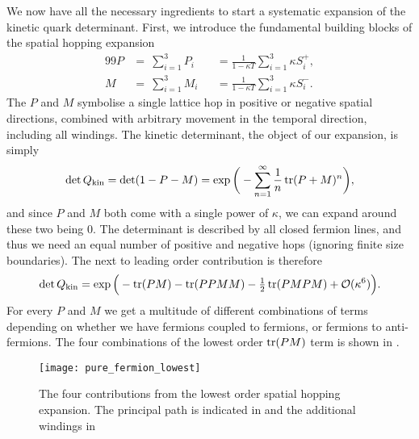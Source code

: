 We now have all the necessary ingredients to start a systematic expansion of the
kinetic quark determinant. First, we introduce the fundamental building blocks
of the spatial hopping expansion
%
\begin{alignat}{99}
  P &= \>\sum_{i=1}^3 P_i &&= \frac{1}{1-\kappa T} \sum_{i=1}^3 \kappa S_i^+, \\
  M &= \>\sum_{i=1}^3 M_i &&= \frac{1}{1-\kappa T} \sum_{i=1}^3 \kappa S_i^-.
\end{alignat}
%
The $P$ and $M$ symbolise a single lattice hop in positive or negative spatial
directions, combined with arbitrary movement in the temporal direction,
including all windings. The kinetic determinant, the object of our expansion, is
simply
%
\begin{equation}
  \det Q_{\text{kin}} = \det ( 1 - P - M ) = \exp \bigg(- \sum_{n=1}^{\infty}
  \frac{1}{n} \operatorname{tr} (P + M)^n \bigg),
\end{equation}
%
and since $P$ and $M$ both come with a single power of $\kappa$, we can expand
around these two being $0$. The determinant is described by all closed fermion
lines, and thus we need an equal number of positive and negative hops (ignoring
finite size boundaries). The next to leading order contribution is therefore
%
\begin{equation}
  \det Q_{\text{kin}} = \exp \Big( - \operatorname{tr}(PM) - \operatorname{tr}(PPMM) -
    {\textstyle\frac{1}{2}}\operatorname{tr}(PMPM) + \mathcal{O}(\kappa^6)\Big).
\end{equation}
%
For every $P$ and $M$ we get a multitude of different combinations of terms
depending on whether we have fermions coupled to fermions, or fermions to
anti-fermions. The four combinations of the lowest order $\operatorname{tr}(PM)$ term is shown in
.

\begin{figure}
  \begin{center}
    \texttt{[image: pure\_fermion\_lowest]}
  \end{center}
  \caption{The four contributions from the lowest order spatial hopping
    expansion. The principal path is indicated in \ColHlIText{} and the
    additional windings in \ColBaseText{}}
  \label{fig:lowest-order-fermionic}
\end{figure}

